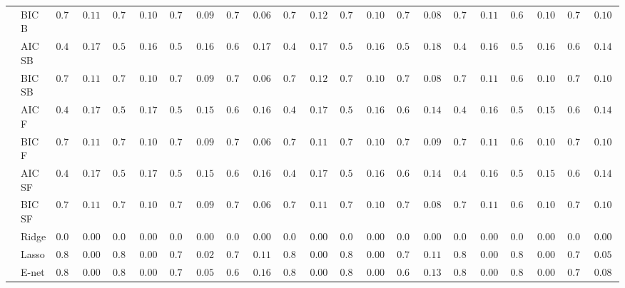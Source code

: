 \begin{tabular}{p{0.2cm}p{1cm}|p{0.6cm}p{0.6cm}|p{0.6cm}p{0.6cm}p{0.6cm}p{0.6cm}p{0.6cm}p{0.6cm}|p{0.6cm}p{0.6cm}p{0.6cm}p{0.6cm}p{0.6cm}p{0.6cm}|p{0.6cm}p{0.6cm}p{0.6cm}p{0.6cm}p{0.6cm}p{0.6cm}}
 & BIC B  & $0.700$ & $0.1189$ & $0.712$ & $0.1076$ & $0.730$ & $0.0959$ & $0.776$ & $0.0653$ & $0.710$ & $0.1219$ & $0.724$ & $0.1093$ & $0.756$ & $0.0880$ & $0.712$ & $0.1148$ & $0.682$ & $0.1029$ & $0.710$ & $0.1040$ \\
 & AIC SB  & $0.478$ & $0.1727$ & $0.516$ & $0.1686$ & $0.542$ & $0.1640$ & $0.640$ & $0.1752$ & $0.492$ & $0.1739$ & $0.526$ & $0.1649$ & $0.586$ & $0.1870$ & $0.476$ & $0.1628$ & $0.508$ & $0.1619$ & $0.624$ & $0.1485$ \\
 & BIC SB  & $0.700$ & $0.1189$ & $0.712$ & $0.1076$ & $0.730$ & $0.0959$ & $0.776$ & $0.0653$ & $0.710$ & $0.1219$ & $0.724$ & $0.1093$ & $0.756$ & $0.0880$ & $0.712$ & $0.1148$ & $0.682$ & $0.1029$ & $0.710$ & $0.1040$ \\
 & AIC F  & $0.480$ & $0.1729$ & $0.520$ & $0.1729$ & $0.558$ & $0.1590$ & $0.676$ & $0.1603$ & $0.498$ & $0.1764$ & $0.542$ & $0.1689$ & $0.656$ & $0.1479$ & $0.476$ & $0.1628$ & $0.522$ & $0.1554$ & $0.648$ & $0.1453$ \\
 & BIC F  & $0.702$ & $0.1155$ & $0.712$ & $0.1076$ & $0.732$ & $0.0952$ & $0.776$ & $0.0653$ & $0.712$ & $0.1183$ & $0.726$ & $0.1088$ & $0.756$ & $0.0925$ & $0.712$ & $0.1148$ & $0.690$ & $0.1040$ & $0.712$ & $0.1037$ \\
 & AIC SF  & $0.480$ & $0.1729$ & $0.520$ & $0.1729$ & $0.558$ & $0.1590$ & $0.676$ & $0.1603$ & $0.498$ & $0.1764$ & $0.544$ & $0.1635$ & $0.658$ & $0.1430$ & $0.476$ & $0.1628$ & $0.522$ & $0.1554$ & $0.648$ & $0.1453$ \\
 & BIC SF  & $0.702$ & $0.1155$ & $0.712$ & $0.1076$ & $0.732$ & $0.0952$ & $0.776$ & $0.0653$ & $0.712$ & $0.1183$ & $0.726$ & $0.1088$ & $0.760$ & $0.0853$ & $0.712$ & $0.1148$ & $0.690$ & $0.1040$ & $0.712$ & $0.1037$ \\
 & Ridge  & $0.000$ & $0.0000$ & $0.000$ & $0.0000$ & $0.000$ & $0.0000$ & $0.000$ & $0.0000$ & $0.000$ & $0.0000$ & $0.000$ & $0.0000$ & $0.000$ & $0.0000$ & $0.000$ & $0.0000$ & $0.000$ & $0.0000$ & $0.000$ & $0.0000$ \\
 & Lasso  & $0.800$ & $0.0000$ & $0.800$ & $0.0000$ & $0.798$ & $0.0200$ & $0.730$ & $0.1150$ & $0.800$ & $0.0000$ & $0.800$ & $0.0000$ & $0.738$ & $0.1126$ & $0.800$ & $0.0000$ & $0.800$ & $0.0000$ & $0.782$ & $0.0575$ \\
 & E-net  & $0.800$ & $0.0000$ & $0.800$ & $0.0000$ & $0.790$ & $0.0522$ & $0.646$ & $0.1604$ & $0.800$ & $0.0000$ & $0.800$ & $0.0000$ & $0.682$ & $0.1366$ & $0.800$ & $0.0000$ & $0.800$ & $0.0000$ & $0.774$ & $0.0836$ \\

\end{tabular}
